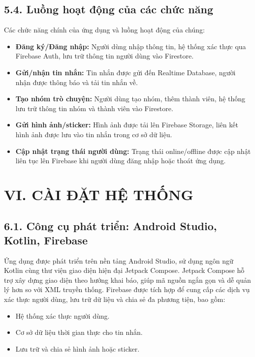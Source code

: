 \documentclass[12pt,a4paper]{article}
\begin{document}
	\vspace{0.7cm}
	
	\subsection*{5.4. Luồng hoạt động của các chức năng}
	\vspace{0.1cm}
	
	\noindent
	Các chức năng chính của ứng dụng và luồng hoạt động của chúng:
	\begin{itemize}
		\item \textbf{Đăng ký/Đăng nhập:} Người dùng nhập thông tin, hệ thống xác thực qua Firebase Auth, lưu trữ thông tin người dùng vào Firestore.
		\item \textbf{Gửi/nhận tin nhắn:} Tin nhắn được gửi đến Realtime Database, người nhận được thông báo và tải tin nhắn về.
		\item \textbf{Tạo nhóm trò chuyện:} Người dùng tạo nhóm, thêm thành viên, hệ thống lưu trữ thông tin nhóm và thành viên vào Firestore.
		\item \textbf{Gửi hình ảnh/sticker:} Hình ảnh được tải lên Firebase Storage, liên kết hình ảnh được lưu vào tin nhắn trong cơ sở dữ liệu.
		\item \textbf{Cập nhật trạng thái người dùng:} Trạng thái online/offline được cập nhật liên tục lên Firebase khi người dùng đăng nhập hoặc thoát ứng dụng.
	\end{itemize}
	
	\vspace{0.5cm}
	
	\section*{VI. CÀI ĐẶT HỆ THỐNG}
	\vspace{0.5cm}
	
	\subsection*{6.1. Công cụ phát triển: Android Studio, Kotlin, Firebase}
	\vspace{0.1cm}
	
	\noindent
	Ứng dụng được phát triển trên nền tảng Android Studio, sử dụng ngôn ngữ Kotlin cùng thư viện giao diện hiện đại Jetpack Compose. Jetpack Compose hỗ trợ xây dựng giao diện theo hướng khai báo, giúp mã nguồn ngắn gọn và dễ quản lý hơn so với XML truyền thống. Firebase được tích hợp để cung cấp các dịch vụ xác thực người dùng, lưu trữ dữ liệu và chia sẻ đa phương tiện, bao gồm:
	\begin{itemize}
		\item Hệ thống xác thực người dùng.
		\item Cơ sở dữ liệu thời gian thực cho tin nhắn.
		\item Lưu trữ và chia sẻ hình ảnh hoặc sticker.
	\end{itemize}
	
\end{document}
